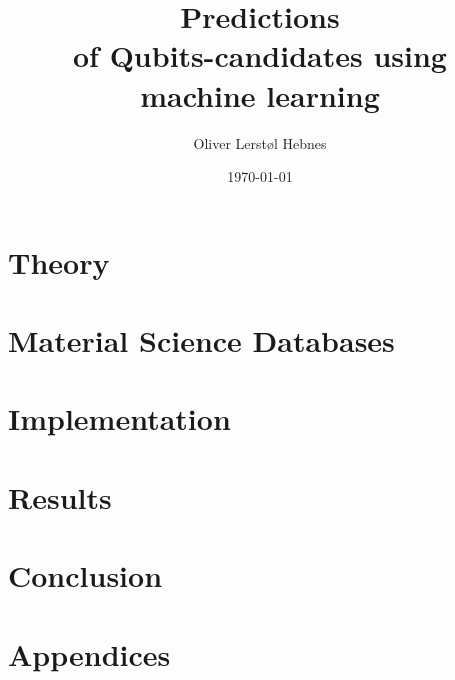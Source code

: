 \documentclass[twoside, english, notitlepage, 12pt]{uiofysmaster}
\author{Oliver Lerstøl Hebnes}
\title{Predictions\\
of Qubits-candidates
using\\ machine learning
}
\date{\today}
\begin{document}
\hypersetup{pageanchor=false}
\frontmatter
    \maketitle

    \begin{abstract}
    
    \end{abstract}

    \begin{acknowledgements}
    
    \end{acknowledgements}

    \tableofcontents
    \newpage

\mainmatter
    

    \part{Theory}
        
        

    \part{Material Science Databases}

      

    \part{Implementation}


    \part{Results}


    \part{Conclusion}


    \part{Appendices}
    \appendix

        

        \nocite{*}
        \printbibliography%
\end{document}
